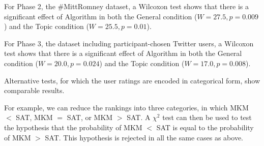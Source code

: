 For Phase 2, the \#MittRomney dataset, a Wilcoxon test shows that
there is a significant effect of Algorithm in both the General
condition ($W = 27.5, p = 0.009$) and the Topic condition ($W = 25.5,
p = 0.01$).

For Phase 3, the dataset including participant-chosen Twitter users, a
Wilcoxon test shows that there is a significant effect of Algorithm in
both the General condition ($W = 20.0, p = 0.024$) and the Topic
condition ($W = 17.0, p = 0.008$).

Alternative tests, for which the user ratings are encoded in
categorical form, show comparable results.  

For example, we can reduce the rankings into three categories, in
which MKM $<$ SAT, MKM $=$ SAT, or MKM $>$ SAT.  A $\chi^2$ test can
then be used to test the hypothesis that the probability of MKM $<$
SAT is equal to the probability of MKM $>$ SAT.  This hypothesis is
rejected in all the same cases as above.